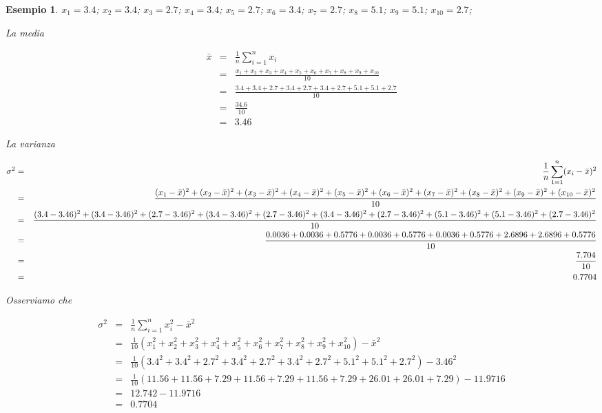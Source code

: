 \documentclass[
  11pt,
]{book}
\theoremstyle{mytheoremstyle}
\theoremstyle{mydefstyle}
\newtheorem{example}{{Esempio}}[section]
\begin{document}
\begin{example}
\(x_{1}=3.4\); \(x_{2}=3.4\); \(x_{3}=2.7\); \(x_{4}=3.4\); \(x_{5}=2.7\); \(x_{6}=3.4\); \(x_{7}=2.7\); \(x_{8}=5.1\); \(x_{9}=5.1\); \(x_{10}=2.7\);

La media

\begin{eqnarray*}
\bar x &=&\frac 1 n \sum_{i=1}^nx_i \\
   &=& \frac{x_{1}+x_{2}+x_{3}+x_{4}+x_{5}+x_{6}+x_{7}+x_{8}+x_{9}+x_{10}} {10} \\
         &=& \frac{3.4+3.4+2.7+3.4+2.7+3.4+2.7+5.1+5.1+2.7}  {10} \\
         &=& \frac{34.6}  {10}\\
         &=& 3.46
\end{eqnarray*}

La varianza

\begin{eqnarray*}
  \sigma^2 &=& \frac 1 n \sum_{1=1}^n(x_i-\bar x)^2\\
         &=& \tiny\frac{(x_{1}-\bar x)^2+(x_{2}-\bar x)^2+(x_{3}-\bar x)^2+(x_{4}-\bar x)^2+(x_{5}-\bar x)^2+(x_{6}-\bar x)^2+(x_{7}-\bar x)^2+(x_{8}-\bar x)^2+(x_{9}-\bar x)^2+(x_{10}-\bar x)^2} {10} \\
         &=& \tiny\frac{( 3.4 - 3.46 )^2+( 3.4 - 3.46 )^2+( 2.7 - 3.46 )^2+( 3.4 - 3.46 )^2+( 2.7 - 3.46 )^2+( 3.4 - 3.46 )^2+( 2.7 - 3.46 )^2+( 5.1 - 3.46 )^2+( 5.1 - 3.46 )^2+( 2.7 - 3.46 )^2}  {10} \\
         &=& \small\frac{0.0036+0.0036+0.5776+0.0036+0.5776+0.0036+0.5776+2.6896+2.6896+0.5776}  {10} \\
         &=& \frac{7.704}  {10}\\
         &=& 0.7704
\end{eqnarray*}

Osserviamo che

\begin{eqnarray*}
  \sigma^2 &=& \frac 1 n\sum_{i=1}^nx_i^2-\bar x^2\\
  &=&\frac{1} {10} (x_{1}^2+x_{2}^2+x_{3}^2+x_{4}^2+x_{5}^2+x_{6}^2+x_{7}^2+x_{8}^2+x_{9}^2+x_{10}^2) -\bar x^2 \\
         &=& \frac1 {10}(3.4 ^2+3.4 ^2+2.7 ^2+3.4 ^2+2.7 ^2+3.4 ^2+2.7 ^2+5.1 ^2+5.1 ^2+2.7 ^2)-3.46^2\\
         &=& \frac1 {10}(11.56+11.56+7.29+11.56+7.29+11.56+7.29+26.01+26.01+7.29)-11.9716\\
         &=& 12.742 -11.9716\\
         &=& 0.7704
\end{eqnarray*}


\end{example}
\end{document}
